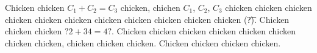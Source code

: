 Chicken chicken $C_1 + C_2 = C_3$ chicken, chichen $C_1$, $C_2$, $C_3$ chicken chicken chicken chicken chicken chicken chicken chicken chicken chicken chicken (\t{?}). Chicken chicken chicken $?2 + 34 = 4?$. Chicken chicken chicken chicken chicken chicken chicken chicken, chicken chicken chicken. Chicken chicken chicken chicken.
